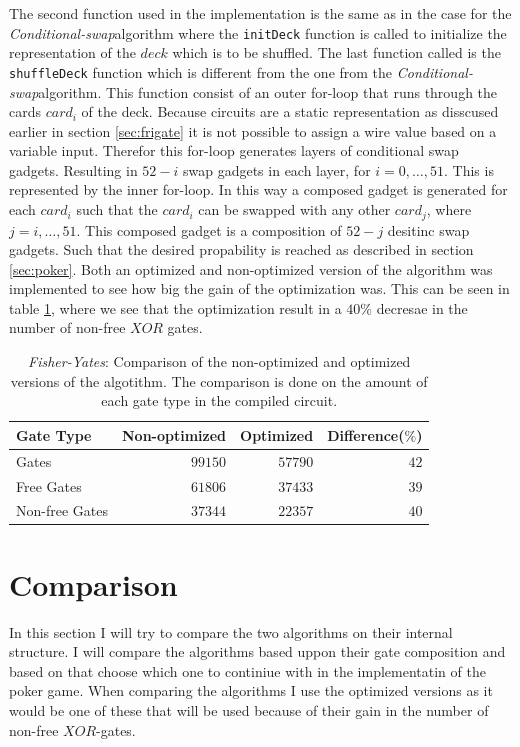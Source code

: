 \documentclass[twoside,11pt,openright]{report}
\newcommand{\FY}{\textit{Fisher-Yates}}
\newcommand{\CS}{\textit{Conditional-swap}}
\begin{document}
The second function used in the implementation is the same as in the case for the \CS algorithm where the \verb|initDeck| function is called to initialize the representation of the $deck$ which is to be shuffled. The last function called is the \verb|shuffleDeck| function which is different from the one from the \CS algorithm. This function consist of an outer for-loop that runs through the cards $card_i$ of the deck. Because circuits are a static representation as disscused earlier in section \ref{sec:frigate} it is not possible to assign a wire value based on a variable input. Therefor this for-loop generates layers of conditional swap gadgets. Resulting in $52-i$ swap gadgets in each layer, for $i=0,\dots, 51$. This is represented by the inner for-loop. In this way a composed gadget is generated for each $card_i$ such that the $card_i$ can be swapped with any other $card_j$, where $j=i,\dots,51$. This composed gadget is a composition of $52-j$ desitinc swap gadgets. Such that the desired propability is reached as described in section \ref{sec:poker}.
Both an optimized and non-optimized version of the algorithm was implemented to see how big the gain of the optimization was. This can be seen in table \ref{table:fy_swap_comp}, where we see that the optimization result in a $40\%$ decresae in the number of non-free $XOR$ gates.

\begin{table}
\centering
\begin{tabular}{l || r r r}
Gate Type      & Non-optimized  & Optimized & Difference($\%$)    \\
\hline
Gates          & $99150$        & $57790$   & $42$ \\
Free Gates     & $61806$        & $37433$   & $39$ \\
Non-free Gates & $37344$        & $22357$   & $40$
\end{tabular}
\caption{\FY: Comparison of the non-optimized and optimized versions of the algotithm. The comparison is done on the amount of each gate type in the compiled circuit.}
\label{table:fy_swap_comp}
\end{table}


\section{Comparison}
\label{sec:comp}

In this section I will try to compare the two algorithms on their internal structure. I will compare the algorithms based uppon their gate composition and based on that choose which one to continiue with in the implementatin of the poker game. When comparing the algorithms I use the optimized versions as it would be one of these that will be used because of their gain in the number of non-free $XOR$-gates.
\end{document}
